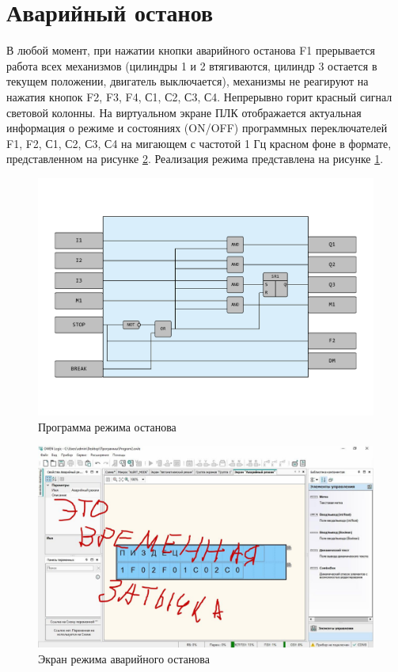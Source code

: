 \section{Аварийный останов}
В любой момент, при нажатии кнопки аварийного останова F1 прерывается
работа всех механизмов (цилиндры 1 и 2 втягиваются, цилиндр 3 остается в
текущем положении, двигатель выключается), механизмы не реагируют на
нажатия кнопок F2, F3, F4, С1, С2, С3, С4. Непрерывно горит красный
сигнал световой колонны. На виртуальном экране ПЛК отображается
актуальная информация о режиме и состояниях (ON/OFF) программных
переключателей F1, F2, С1, С2, С3, С4 на мигающем с частотой 1 Гц
красном фоне в формате, представленном на рисунке \ref{fig:alert_screen}.
Реализация режима представлена на рисунке \ref{fig:alert_mode}.
\begin{figure}[pt]
    \centering
    \includegraphics[scale=0.5]{fig/alert_mode.pdf}
    \caption{Программа режима останова}
    \label{fig:alert_mode}
\end{figure}

\begin{figure}[pb]
    \centering
    \includegraphics[scale=0.30]{fig/4.1.jpg}
    \caption{Экран режима аварийного останова}
    \label{fig:alert_screen}
\end{figure}


